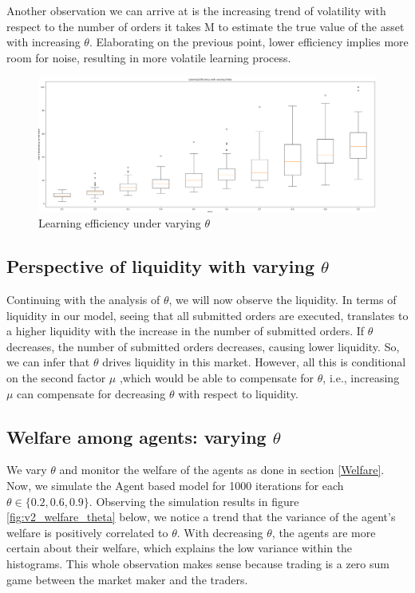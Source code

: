 \documentclass{article}
\begin{document}
Another observation we can arrive at is the increasing trend of volatility with respect to the number of orders it takes M to estimate the true value of the asset with increasing $\theta$. Elaborating on the previous point, lower efficiency implies more room for noise, resulting in more volatile learning process.

\begin{figure}[h]
    \centering
    \includegraphics[scale=0.28]{v2_efficiency_theta.png}
    \caption{Learning efficiency under varying $\theta$}
    \label{fig:v2_efficiency_theta}
\end{figure}

\subsection{Perspective of liquidity with varying $\theta$}
Continuing with the analysis of $\theta$, we will now observe the liquidity. In terms of liquidity in our model, seeing that all submitted orders are executed, translates to a higher liquidity with the increase in the number of submitted orders. If $\theta$ decreases, the number of submitted orders decreases, causing lower liquidity. So, we can infer that $\theta$ drives liquidity in this market. However, all this is conditional on the second factor $\mu$ ,which would be able to compensate for $\theta$, i.e., increasing $\mu$ can compensate for decreasing $\theta$ with respect to liquidity.

\subsection{Welfare among agents: varying $\theta$}
We vary $\theta$ and monitor the welfare of the agents as done in section \ref{Welfare}. Now, we simulate the Agent based model for 1000 iterations for each $\theta \in \{0.2, 0.6, 0.9\}$. Observing the simulation results in figure \ref{fig:v2_welfare_theta} below, we notice a trend that the variance of the agent's welfare is positively correlated to $\theta$. With decreasing $\theta$, the agents are more certain about their welfare, which explains the low variance within the histograms. This whole observation makes sense because trading is a zero sum game between the market maker and the traders.
\end{document}
